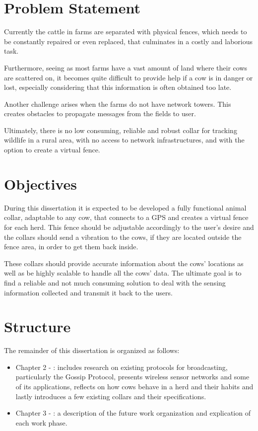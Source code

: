 \section{Problem Statement}
\label{sec:problem_statement}
Currently the cattle in farms are separated with physical fences, which needs to be constantly
repaired or even replaced, that culminates in a costly and laborious task.

Furthermore, seeing as most farms have a vast amount of land where their cows are scattered on,
it becomes quite difficult to provide help if a cow is in danger or lost, especially considering
that this information is often obtained too late.

Another challenge arises when the farms do not have network towers. This creates obstacles to
propagate messages from the fields to user.

Ultimately, there is no low consuming, reliable and robust collar for tracking wildlife in a
rural area, with no access to network infrastructures, and with the option to create a virtual
fence.

\section{Objectives}
\label{sec:objectives}
During this dissertation it is expected to be developed a fully functional animal collar,
adaptable to any cow, that connects to a \Gls{GPS} and creates a virtual fence for each herd. This
fence should be adjustable accordingly to the user's desire and the collars should send a
vibration to the cows, if they are located outside the fence area, in order to get them back
inside.

These collars should provide accurate information about the cows' locations as well as be
highly scalable to handle all the cows' data. The ultimate goal is to find a reliable and
not much consuming solution to deal with the sensing information collected and transmit it
back to the users.


\section{Structure}
\label{sec:structure}
The remainder of this dissertation is organized as follows:
\begin{itemize}
      \item Chapter 2 - : includes research on existing protocols
            for broadcasting, particularly the Gossip Protocol, presents wireless sensor
            networks and some of its applications, reflects on how cows behave in a herd and
            their habits and lastly introduces a few existing collars and their specifications.
      \item Chapter 3 - : a description of the future work
            organization and explication of each work phase.
\end{itemize}
